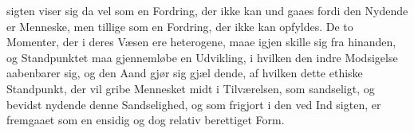 \documentclass[12pt,a4paper]{book}
\newcommand{\gk}[1]{\textit{#1}}
\begin{document}
sigten viser sig da vel som en Fordring, der ikke kan und\-%
gaaes fordi den Nydende er Menneske, men tillige som en
Fordring, der ikke kan opfyldes. De to Momenter, der i
deres Væsen ere heterogene, maae igjen skille sig fra hinanden,
og Standpunktet maa gjennemløbe en Udvikling, i hvilken den
indre Modsigelse aabenbarer sig, og den Aand gjør sig gjæl\-%
dende, af hvilken dette ethiske Standpunkt, der vil gribe
Mennesket midt i Tilværelsen, som sandseligt, og bevidst
nydende denne Sandselighed, og som frigjort i den ved Ind\-%
sigten, er fremgaaet som en ensidig og dog relativ berettiget
Form.
\end{document}
